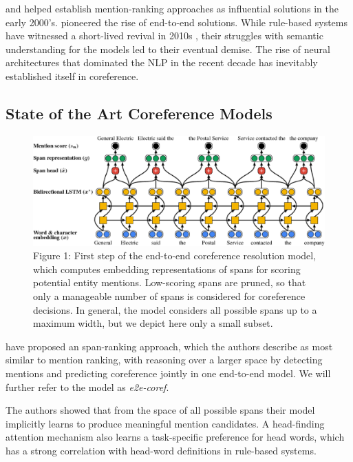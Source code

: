 \documentclass[11pt]{article}
\begin{document}
\textcite{yang2003coref} and \textcite{iida2003incorporating} helped establish mention-ranking approaches as influential solutions in the early 2000's. \textcite{ng2005b} pioneered the rise of end-to-end solutions. While rule-based systems have witnessed a short-lived revival in 2010s \parencite{zhou2004, haghighi2009}, their struggles with semantic understanding for the models led to their eventual demise.  The rise of neural architectures that dominated the NLP in the recent decade has inevitably established itself in coreference. 

\subsection{State of the Art Coreference Models}

\begin{figure}[ht]
  \includegraphics[width=\textwidth]{e2emodel.eps}
  \caption{Figure 1: First step of the end-to-end coreference resolution model, which computes embedding representations of spans for scoring potential entity mentions. Low-scoring spans are pruned, so that only a manageable number of spans is considered for coreference decisions. In general, the model considers all possible spans up to a maximum width, but we depict here only a small subset. \parencite{lee2017end}}
  \label{fig:e2emodel}
\end{figure}

\textcite{lee2017end} have proposed an span-ranking approach, which the authors describe as most similar to mention ranking, with reasoning over a larger space by detecting mentions and predicting coreference jointly in one end-to-end model. We will further refer to the model as \textit{e2e-coref}.


The authors showed that from the space of all possible spans their model implicitly  learns to produce meaningful mention candidates. A head-finding attention mechanism also learns a task-specific preference for head words, which has a strong correlation with head-word definitions in rule-based systems.
\end{document}
